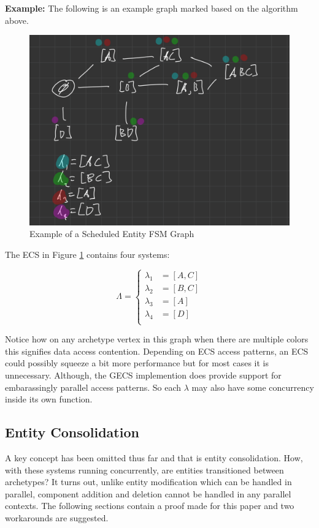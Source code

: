 \textbf{Example:} The following is an example graph marked based on the algorithm above.

\begin{figure}[H]
    \centering
    \includegraphics[width=0.5\linewidth]{resources/graph2.png}
    \caption{Example of a Scheduled Entity FSM Graph}
    \label{fig:graph2}
\end{figure}

The ECS in Figure \ref{fig:graph2} contains four systems: 

\begin{equation*}
    \Lambda = \begin{cases}
        \lambda_1 &= [A,C] \\
        \lambda_2 &= [B,C] \\ 
        \lambda_3 &= [A] \\ 
        \lambda_4 &= [D] \\ 
    \end{cases}
\end{equation*}

Notice how on any archetype vertex in this graph when there are multiple colors this signifies data access contention. Depending on ECS access patterns, an ECS could possibly squeeze a bit more performance but for most cases it is unnecessary. Although, the GECS implemention does provide support for embarassingly parallel access patterns. So each $\lambda$ may also have some concurrency inside its own function.

\subsection{Entity Consolidation}
A key concept has been omitted thus far and that is entity consolidation. How, with these systems running concurrently, are entities transitioned between archetypes? It turns out, unlike entity modification which can be handled in parallel, component addition and deletion cannot be handled in any parallel contexts. The following sections contain a proof made for this paper and two workarounds are suggested.

